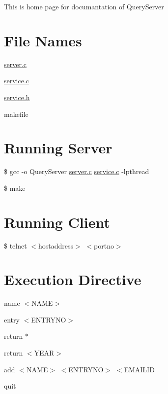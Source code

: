 This is home page for documantation of QueryServer\hypertarget{index_files}{}\section{File Names}\label{index_files}

\begin{DoxyEnumerate}
\item \hyperlink{server_8c}{server.c}
\item \hyperlink{service_8c}{service.c}
\item \hyperlink{service_8h}{service.h}
\item makefile 
\end{DoxyEnumerate}\hypertarget{index_server}{}\section{Running Server}\label{index_server}

\begin{DoxyEnumerate}
\item \$ gcc -\/o QueryServer \hyperlink{server_8c}{server.c} \hyperlink{service_8c}{service.c} -\/lpthread
\item \$ make 
\end{DoxyEnumerate}\hypertarget{index_client}{}\section{Running Client}\label{index_client}

\begin{DoxyEnumerate}
\item \$ telnet $<$hostaddress$>$ $<$portno$>$ 
\end{DoxyEnumerate}\hypertarget{index_execution}{}\section{Execution Directive}\label{index_execution}

\begin{DoxyEnumerate}
\item name $<$NAME$>$
\item entry $<$ENTRYNO$>$
\item return $\ast$
\item return $<$YEAR$>$
\item add $<$NAME$>$ $<$ENTRYNO$>$ $<$EMAILID
\item quit 
\end{DoxyEnumerate}